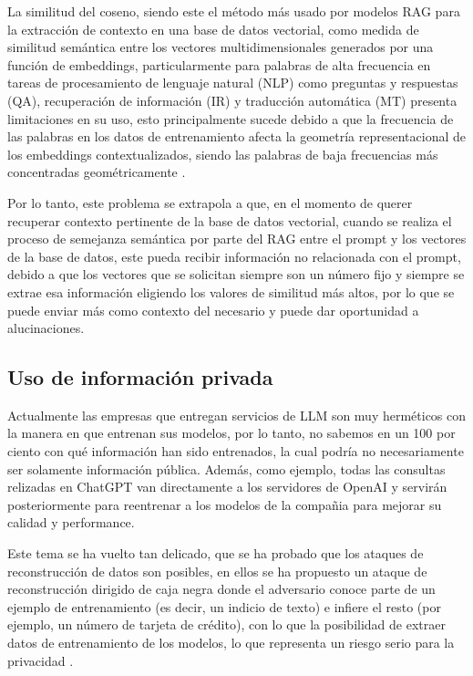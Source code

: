 La similitud del coseno, siendo este el método más usado por modelos RAG para la extracción de contexto en una base de datos vectorial, 
como medida de similitud semántica entre los vectores multidimensionales generados por una función de embeddings, particularmente para palabras de alta frecuencia en tareas de 
procesamiento de lenguaje natural (NLP) como preguntas y respuestas (QA), recuperación de información (IR) y traducción 
automática (MT) presenta limitaciones en su uso, esto principalmente sucede debido a que la frecuencia de las palabras en los 
datos de entrenamiento afecta la geometría representacional de los embeddings contextualizados, siendo las palabras de baja 
frecuencias más concentradas geométricamente \cite{coseno}.

Por lo tanto, este problema se extrapola a que, en el momento de querer recuperar contexto pertinente de la base de datos vectorial, 
cuando se realiza el proceso de semejanza semántica por parte del RAG entre el prompt y los vectores de la base de datos, este pueda recibir 
información no relacionada con el prompt, debido a que los vectores que se solicitan siempre son un número fijo y siempre se extrae esa información eligiendo los valores de similitud más altos, por lo que se puede enviar más como contexto del necesario y puede dar oportunidad a alucinaciones.

\subsection{Uso de información privada}

Actualmente las empresas que entregan servicios de LLM son muy herméticos con la manera en que entrenan sus modelos, por lo tanto, no sabemos en un 100 por ciento
con qué información han sido entrenados, la cual podría no necesariamente ser solamente información pública. Además, como ejemplo, todas las consultas relizadas en ChatGPT van directamente a los servidores de OpenAI y servirán posteriormente para reentrenar a los modelos de la compañia para mejorar su calidad y performance.

Este tema se ha vuelto tan delicado, que se ha probado que los ataques de reconstrucción de datos son posibles, en ellos se ha propuesto un ataque de reconstrucción dirigido de caja negra donde el 
adversario conoce parte de un ejemplo de entrenamiento (es decir, un indicio de texto) e infiere el resto (por ejemplo, un número de tarjeta de crédito), 
con lo que la posibilidad de extraer datos de entrenamiento de los modelos, lo que representa un riesgo serio para la privacidad \cite{privacidad1}. 

